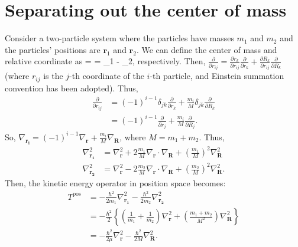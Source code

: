 \section{Separating out the center of mass}
Consider a two-particle system where the particles have masses $m_1$ and $m_2$ and the particles' positions are $\bm{r}_1$ and $\bm{r}_2$. We can define the center of mass and relative coordinate as
\bea
	 = \quad {} = _1 - _2,
\eea
respectively. Then, $\frac{\partial}{\partial r_{ij}}=\frac{\partial r_k}{\partial r_{ij}}\frac{\partial}{\partial r_k} + \frac{\partial R_k}{\partial r_{ij}}\frac{\partial}{\partial R_k}$ (where $r_{ij}$ is the $j$-th coordinate of the $i$-th particle, and Einstein summation convention has been adopted). Thus,
\begin{align*}
    \frac{\partial}{\partial r_{ij}} &= (-1)^{i-1}\delta_{jk}\frac{\partial}{\partial r_k} + \frac{m_i}{M}\delta_{jk}\frac{\partial}{\partial R_k}\\
                                     &= (-1)^{i-1}\frac{\partial}{\partial r_j} + \frac{m_i}{M}\frac{\partial}{\partial R_j}.
\end{align*}
So, $\nabla_{\mathbf{r_i}}=(-1)^{i-1}\nabla_{\mathbf{r}} + \frac{m_i}{M}\nabla_{\mathbf{R}}$, where $M=m_1+m_2$. Thus,
\begin{align*}
    \nabla^2_{\mathbf{r_1}}&=\nabla_{\mathbf{r}}^2 + 2\frac{m_1}{M} \nabla_{\mathbf{r}}\cdot\nabla_{\mathbf{R}} + \left(\frac{m_1}{M}\right)^2\nabla^2_{\mathbf{R}}\\
    \nabla^2_{\mathbf{r_2}}&=\nabla_{\mathbf{r}}^2-2\frac{m_2}{M}\nabla_{\mathbf{r}}\cdot\nabla_{\mathbf{R}} + \left(\frac{m_2}{M}\right)^2\nabla^2_{\mathbf{R}}.
\end{align*}
Then, the kinetic energy operator in position space becomes:
\begin{align*}
    T^{\text{pos}} &= -\frac{\hbar^2}{2m_1}\nabla^2_{\mathbf{r_1}} - \frac{\hbar^2}{2m_2}\nabla^2_{\mathbf{r_2}} \\
            &= -\frac{\hbar^2}{2}\left\{ \left(\frac{1}{m_1}+\frac{1}{m_2}\right)\nabla^2_{\mathbf{r}} + \left(\frac{m_1+m_2}{M^2}\right) \nabla_{\mathbf{R}}^2\right\} \\
            &= -\frac{\hbar^2}{2\mu}\nabla_{\mathbf{r}}^2 -\frac{\hbar^2}{2M}\nabla^2_{\mathbf{R}}.\\
\end{align*}
